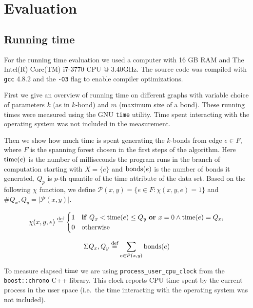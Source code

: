 \chapter{Evaluation}
\label{chapter_evaluation}

\section{Running time}

For the running time evaluation we used a computer with 16 GB RAM and The Intel(R) Core(TM) i7-3770 CPU @ 3.40GHz. The source code was compiled with \lstinline|gcc| 4.8.2 and the \lstinline|-O3| flag to enable compiler optimizations.

First we give an overview of running time on different graphs with variable choice of parameters $k$ (as in $k$-bond) and $m$ (maximum size of a bond). These running times were measured using the GNU \lstinline|time| utility. Time spent interacting with the operating system was not included in the measurement.

Then we show how much time is spent generating the $k$-bonds from edge $e \in F$, where $F$ is the spanning forest chosen in the first steps of the algorithm. Here $\operatorname{time}(e)$ is the number of milliseconds the program runs in the branch of computation starting with $X = \{e\}$ and $\operatorname{bonds}(e)$ is the number of bonds it generated, $Q_p$ is $p$-th quantile of the time attribute of the data set. Based on the following $\chi$ function, we define $\mathcal{P}(x,y) = \{ e \in F : \chi(x,y,e) = 1 \}$ and $\#Q_x, Q_y = \lvert \mathcal{P}(x,y) \rvert$.

\[
	\chi(x, y, e) \stackrel{\text{def}}{=}
	\begin{cases}
		\hfill 1  \hfill & \text{\textbf{if} $Q_x < \mtime(e) \leq Q_y$ \break \textbf{or} $x=0 \wedge \mtime(e) = Q_x$,} \\
		\hfill 0  \hfill & \text{otherwise} \\
	\end{cases}
\]

\[
	\Sigma Q_x, Q_y \stackrel{\text{def}}{=} \sum_{e \in \mathcal{P}(x,y)} \operatorname{bonds}(e)
\]

To measure elapsed $\operatorname{time}$ we are using \lstinline|process_user_cpu_clock| from the \lstinline|boost::chrono| \thinspace C++ library. This clock reports CPU time spent by the current process in the user space (i.e.\ the time interacting with the operating system was not included).


\clearpage

